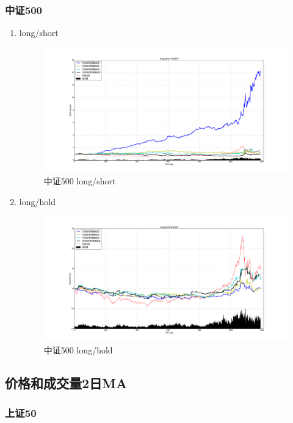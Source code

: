 \documentclass[12pt,a4paper]{article}
\begin{document}
\subsubsection{中证500}
\begin{enumerate}
\item long/short 
\begin{figure}[H]
	\centering
	\includegraphics[width=1.0\textwidth]{img_r_1/zz500.png}
	\caption{中证500 long/short }
\end{figure}
\item long/hold 
\begin{figure}[H]
	\centering
	\includegraphics[width=1.0\textwidth]{img_r_1/zz500_1.png}
	\caption{中证500 long/hold}
\end{figure}
\end{enumerate}

\subsection{价格和成交量2日MA}
\subsubsection{上证50}
\end{document}
